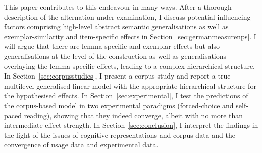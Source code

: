 This paper contributes to this endeavour in many ways.
After a thorough description of the alternation under examination, I discuss potential influencing factors comprising high-level abstract semantic generalisations as well as exemplar-similarity and item-specific effects in Section~\ref{sec:germanmeasurenps}.
I will argue that
there are lemma-specific and exemplar effects but also generalisations at the level of the construction as well as generalisations overlaying the lemma-specific effects, leading to a complex hierarchical structure.
In Section~\ref{sec:corpusstudies}, I present a corpus study and report a true multilevel generalised linear model with the appropriate hierarchical structure for the hypothesised effects.
In Section~\ref{sec:experimental}, I test the predictions of the corpus-based model in two experimental paradigms (forced-choice and self-paced reading), showing that they indeed converge, albeit with no more than intermediate effect strength.
In Section~\ref{sec:conclusion}, I interpret the findings in the light of the issues of cognitive representations and corpus data and the convergence of usage data and experimental data.
